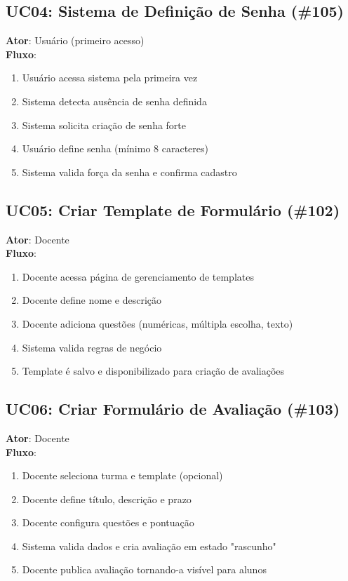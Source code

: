 \documentclass[a4paper,12pt]{article}
\begin{document}
\subsection{UC04: Sistema de Definição de Senha (\#105)}
\textbf{Ator}: Usuário (primeiro acesso)\\
\textbf{Fluxo}:
\begin{enumerate}
    \item Usuário acessa sistema pela primeira vez
    \item Sistema detecta ausência de senha definida
    \item Sistema solicita criação de senha forte
    \item Usuário define senha (mínimo 8 caracteres)
    \item Sistema valida força da senha e confirma cadastro
\end{enumerate}

\subsection{UC05: Criar Template de Formulário (\#102)}
\textbf{Ator}: Docente\\
\textbf{Fluxo}:
\begin{enumerate}
    \item Docente acessa página de gerenciamento de templates
    \item Docente define nome e descrição
    \item Docente adiciona questões (numéricas, múltipla escolha, texto)
    \item Sistema valida regras de negócio
    \item Template é salvo e disponibilizado para criação de avaliações
\end{enumerate}

\subsection{UC06: Criar Formulário de Avaliação (\#103)}
\textbf{Ator}: Docente\\
\textbf{Fluxo}:
\begin{enumerate}
    \item Docente seleciona turma e template (opcional)
    \item Docente define título, descrição e prazo
    \item Docente configura questões e pontuação
    \item Sistema valida dados e cria avaliação em estado "rascunho"
    \item Docente publica avaliação tornando-a visível para alunos
\end{enumerate}
\end{document}
